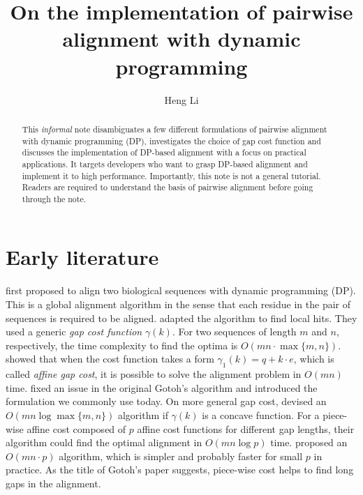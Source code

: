 \documentclass{bioinfo}
\begin{document}

\title[Alignment with DP]{On the implementation of pairwise alignment with dynamic programming}
\author[Li]{Heng Li}
\address{Broad Institute, 415 Main Street, Cambridge, MA 02142, USA}

\maketitle

\begin{abstract}
This \emph{informal} note disambiguates a few different formulations of
pairwise alignment with dynamic programming (DP), investigates the choice of
gap cost function and discusses the implementation of DP-based alignment with a
focus on practical applications. It targets developers who want to grasp
DP-based alignment and implement it to high performance. Importantly, this note
is not a general tutorial. Readers are required to understand the basis of
pairwise alignment before going through the note.
\end{abstract}

\section{Early literature}

\citet{Needleman:1970aa} first proposed to align two biological sequences with
dynamic programming (DP). This is a global alignment algorithm in the sense
that each residue in the pair of sequences is required to be aligned.
\citet{Smith:1981aa} adapted the algorithm to find local hits. They used a
generic \emph{gap cost function} $\gamma(k)$. For two sequences of length $m$
and $n$, respectively, the time complexity to find the optima is
$O(mn\cdot\max\{m,n\})$. \citet{Gotoh:1982aa} showed that when the cost
function takes a form $\gamma_1(k)=q+k\cdot e$, which is called \emph{affine gap
cost}, it is possible to solve the alignment problem in $O(mn)$ time.
\citet{Altschul:1986aa} fixed an issue in the original Gotoh's algorithm and
introduced the formulation we commonly use today. On more general
gap cost, \citet{Miller:1988aa} devised an $O(mn\log\max\{m,n\})$ algorithm
if $\gamma(k)$ is a concave function. For a piece-wise affine cost composed of
$p$ affine cost functions for different gap lengths, their algorithm could find
the optimal alignment in $O(mn\log p)$ time. \citet{Gotoh:1990aa} proposed an
$O(mn\cdot p)$ algorithm, which is simpler and probably faster for small $p$ in
practice. As the title of Gotoh's paper suggests, piece-wise cost helps
to find long gaps in the alignment.
\end{document}
